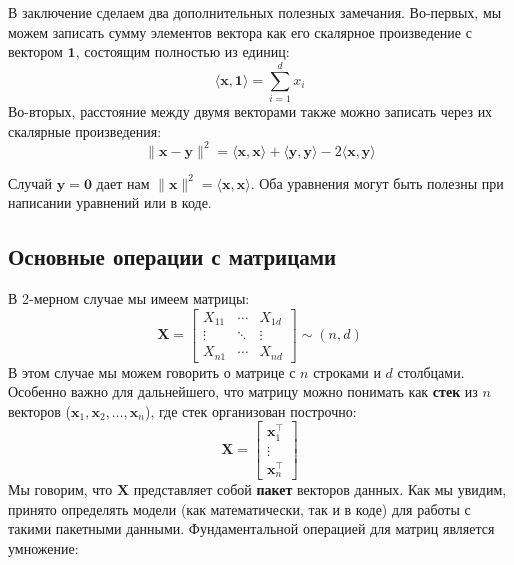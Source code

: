 В заключение сделаем два дополнительных полезных замечания. Во-первых, мы можем записать сумму элементов вектора как его скалярное произведение с вектором $\mathbf{1}$, состоящим полностью из единиц:
%
$$
\langle\mathbf{x},\mathbf{1}\rangle=\sum_{i=1}^d x_i
$$
%
Во-вторых, расстояние между двумя векторами также можно записать через их скалярные произведения:
%
$$
\lVert \mathbf{x} -\mathbf{y}\rVert^2 = \langle \mathbf{x},\mathbf{x}\rangle + \langle \mathbf{y},\mathbf{y}\rangle - 2 \langle \mathbf{x},\mathbf{y}\rangle
$$

Случай $\mathbf{y}=\mathbf{0}$ дает нам $\lVert \mathbf{x} \rVert^2 = \langle \mathbf{x}, \mathbf{x} \rangle$. Оба уравнения могут быть полезны при написании уравнений или в коде.

\subsection{Основные операции с матрицами}

В 2-мерном случае мы имеем матрицы:
%
$$
\mathbf{X}=\begin{bmatrix} X_{11} & \cdots & X_{1d} \\ \vdots & \ddots & \vdots \\ X_{n1} & \cdots & X_{nd}\end{bmatrix} \sim (n,d)
$$
%
В этом случае мы можем говорить о матрице с $n$ строками и $d$ столбцами. Особенно важно для дальнейшего, что матрицу можно понимать как \textbf{стек} из $n$ векторов ($\mathbf{x}_1, \mathbf{x}_2, \ldots, \mathbf{x}_n$), где стек организован построчно:
%
$$
\mathbf{X} = \begin{bmatrix} \mathbf{x}_1^\top \\ \vdots \\ \mathbf{x}_n^\top \end{bmatrix}
$$
%
Мы говорим, что $\mathbf{X}$ представляет собой \textbf{пакет} векторов данных. Как мы увидим, принято определять модели (как математически, так и в коде) для работы с такими пакетными данными. Фундаментальной операцией для матриц является умножение:

